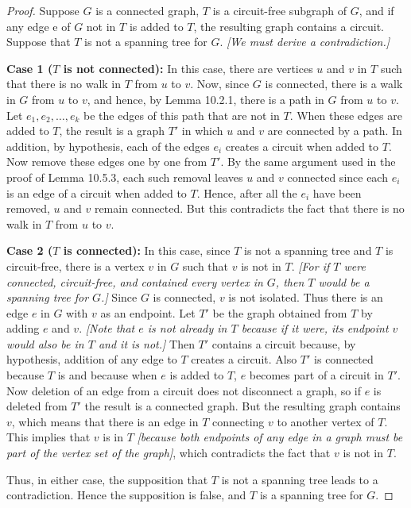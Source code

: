 \documentclass[14pt]{extarticle}
\begin{document}
\begin{proof}
    Suppose \(G\) is a connected graph, \(T\) is a circuit-free subgraph of \(G\), and if any edge e of \(G\) not in \(T\) is
    added to \(T\), the resulting graph contains a circuit. Suppose that \(T\) is not a spanning tree for \(G\).
        {\it [We must derive a contradiction.]}

        {\bf Case 1 (\(T\) is not connected):} In this case, there are vertices \(u\) and \(v\) in \(T\) such that there is no walk
    in \(T\) from \(u\) to \(v\). Now, since \(G\) is connected, there is a walk in \(G\) from \(u\) to \(v\), and hence, by
    Lemma 10.2.1, there is a path in \(G\) from \(u\) to \(v\). Let \(e_1, e_2, \ldots, e_k\) be the edges of this path that
    are not in \(T\). When these edges are added to \(T\), the result is a graph \(T'\) in which \(u\) and \(v\) are
    connected by a path. In addition, by hypothesis, each of the edges \(e_i\) creates a circuit when added to \(T\). Now
    remove these edges one by one from \(T'\). By the same argument used in the proof of Lemma 10.5.3, each such removal
    leaves \(u\) and \(v\) connected since each \(e_i\) is an edge of a circuit when added to \(T\). Hence, after all the \(e_i\)
    have been removed, \(u\) and \(v\) remain connected. But this contradicts the fact that there is no walk in \(T\) from
    \(u\) to \(v\).

        {\bf Case 2 (\(T\) is connected):} In this case, since \(T\) is not a spanning tree and \(T\) is circuit-free, there is a
    vertex \(v\) in \(G\) such that \(v\) is not in \(T\). {\it [For if \(T\) were connected, circuit-free, and contained
                every vertex in \(G\), then \(T\) would be a spanning tree for \(G\).]} Since \(G\) is connected, \(v\) is not isolated. Thus
    there is an edge \(e\) in \(G\) with \(v\) as an endpoint. Let \(T'\)  be the graph obtained from \(T\) by adding \(e\) and
    \(v\). {\it [Note that \(e\) is not already in \(T\) because if it were, its endpoint \(v\) would also be in \(T\) and it
                is not.]} Then \(T'\) contains a circuit because, by hypothesis, addition of any edge to \(T\) creates a circuit.
    Also \(T'\) is connected because \(T\) is and because when \(e\) is added to \(T\), \(e\) becomes part of a circuit in
    \(T'\). Now deletion of an edge from a circuit does not disconnect a graph, so if \(e\) is deleted from \(T'\) the
    result is a connected graph. But the resulting graph contains \(v\), which means that there is an edge in \(T\) connecting
    \(v\) to another vertex of \(T\). This implies that \(v\) is in \(T\) {\it [because both endpoints of any edge in a graph
                must be part of the vertex set of the graph]}, which contradicts the fact that \(v\) is not in \(T\).

    Thus, in either case, the supposition that \(T\) is not a spanning tree leads to a contradiction. Hence the supposition
    is false, and \(T\) is a spanning tree for \(G\).
\end{proof}
\end{document}

